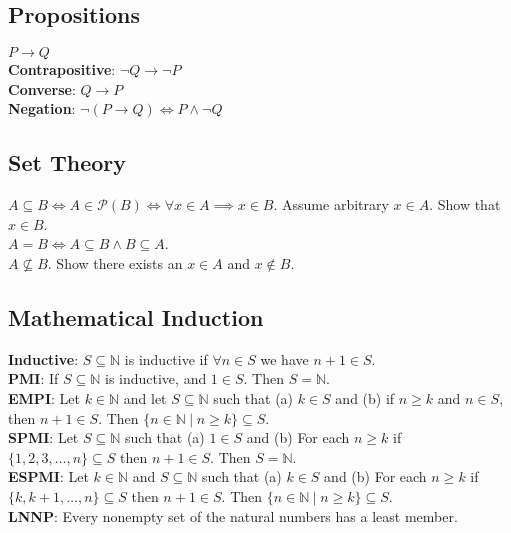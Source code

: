 \documentclass{article}
\newcommand\setbar{\hspace{3pt} \big| \hspace{3pt}}
\begin{document}
 

\begin{multicols}{3}
  \subsection*{Propositions}
  $P \to Q$\\
  \textbf{Contrapositive}: $\neg Q \to \neg P$\\
  \textbf{Converse}: $Q \to P$\\
  \textbf{Negation}: $\neg (P \to Q) \iff P \wedge \neg Q$
  \subsection*{Set Theory}
  $A \subseteq B \iff A \in \mathcal P(B) \iff \forall x \in A \implies x \in B$.
  Assume arbitrary $x \in A$. Show that $x \in B$.\\
  $A = B \iff A \subseteq B \wedge B \subseteq A$.\\
  $A \not \subseteq B$. Show there exists an $x \in A$ and $x \not \in B$.\\

  \subsection*{Mathematical Induction}
  \textbf{Inductive}: $S \subseteq \mathbb N$ is inductive if $\forall n \in S$ we have $n + 1 \in S$.\\
  \textbf{PMI}: If $S \subseteq \mathbb N$ is inductive, and $1 \in S$. Then $S = \mathbb N$.\\
  \textbf{EMPI}: Let $k \in \mathbb N$ and let $S \subseteq \mathbb N$ such that
  (a) $k \in S$ and (b) if $n \geq k$ and $n \in S$, then $n + 1 \in S$. 
  Then $\{n \in \mathbb N \setbar n \geq k \} \subseteq S$.\\
  \textbf{SPMI}: Let $S \subseteq \mathbb N$ such that
  (a) $1 \in S$ and 
  (b) For each $n \geq k$ if $\{1,2,3,\ldots,n\} \subseteq S$ then $n + 1 \in S$. Then $S = \mathbb N$.\\
  \textbf{ESPMI}:  Let $k \in \mathbb N$ and $S \subseteq \mathbb N$ such that
  (a) $k \in S$ and 
  (b) For each $n \geq k$ if $\{k,k+1,\ldots,n\} \subseteq S$ then $n + 1 \in S$. 
  Then $\{n \in \mathbb N \setbar n \geq k\} \subseteq S$.\\
  \textbf{LNNP}: Every nonempty set of the natural numbers has a least member.


\end{multicols}
\end{document}
